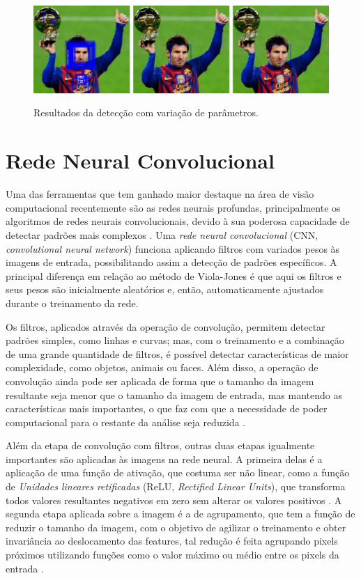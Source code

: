 \begin{figure}[htb]
    \centering
    \caption{Resultados da detecção com variação de parâmetros.}
    \includegraphics[scale=.2]{figs/min_neighbors_messi.png}
    \label{fig:min-neighbors-messi}
\end{figure}

\section{Rede Neural Convolucional}

Uma das ferramentas que tem ganhado maior destaque na área de visão computacional recentemente são as redes neurais profundas, principalmente os algoritmos de redes neurais convolucionais, devido à sua poderosa capacidade de detectar padrões mais complexos \cite{gu2018recent}. Uma \textit{rede neural convolucional} (CNN, \textit{convolutional neural network}) funciona aplicando filtros com variados pesos às imagens de entrada, possibilitando assim a detecção de padrões específicos. A principal diferença em relação ao método de Viola-Jones é que aqui os filtros e seus pesos são inicialmente aleatórios e, então, automaticamente ajustados durante o treinamento da rede.

Os filtros, aplicados através da operação de convolução, permitem detectar padrões simples, como linhas e curvas; mas, com o treinamento e a combinação de uma grande quantidade de filtros, é possível detectar características de maior complexidade, como objetos, animais ou faces. Além disso, a operação de convolução ainda pode ser aplicada de forma que o tamanho da imagem resultante seja menor que o tamanho da imagem de entrada, mas mantendo as características mais importantes, o que faz com que a necessidade de poder computacional para o restante da análise seja reduzida \cite{cnn_face_detection}.

Além da etapa de convolução com filtros, outras duas etapas igualmente importantes são aplicadas às imagens na rede neural. A primeira delas é a aplicação de uma função de ativação, que costuma ser não linear, como a função de \textit{Unidades lineares retificadas} (ReLU, \textit{Rectified Linear Units}), que transforma todos valores resultantes negativos em zero sem alterar os valores positivos \cite{relu_ide2017improvement}. A segunda etapa aplicada sobre a imagem é a de agrupamento, que tem a função de reduzir o tamanho da imagem, com o objetivo de agilizar o treinamento e obter invariância ao deslocamento das features, tal redução é feita agrupando pixels próximos utilizando funções como o valor máximo ou médio entre os pixels da entrada \cite{vargas2016estudo}.

